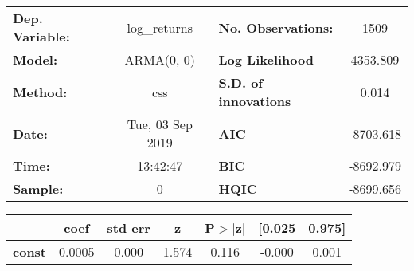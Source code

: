 \begin{center}
\begin{tabular}{lclc}
\toprule
\textbf{Dep. Variable:} &   log\_returns   & \textbf{  No. Observations:  } &    1509     \\
\textbf{Model:}         &    ARMA(0, 0)    & \textbf{  Log Likelihood     } &  4353.809   \\
\textbf{Method:}        &       css        & \textbf{  S.D. of innovations} &   0.014     \\
\textbf{Date:}          & Tue, 03 Sep 2019 & \textbf{  AIC                } & -8703.618   \\
\textbf{Time:}          &     13:42:47     & \textbf{  BIC                } & -8692.979   \\
\textbf{Sample:}        &        0         & \textbf{  HQIC               } & -8699.656   \\
\bottomrule
\end{tabular}
\begin{tabular}{lcccccc}
               & \textbf{coef} & \textbf{std err} & \textbf{z} & \textbf{P$> |$z$|$} & \textbf{[0.025} & \textbf{0.975]}  \\
\midrule
\textbf{const} &       0.0005  &        0.000     &     1.574  &         0.116        &       -0.000    &        0.001     \\
\bottomrule
\end{tabular}
\end{center}
